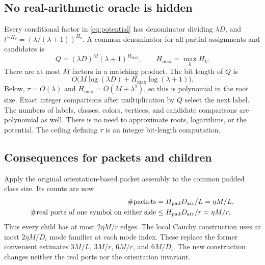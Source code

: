 \documentclass[11pt]{article}
\theoremstyle{remark}\newtheorem{remark}[theorem]{Remark}
\newcommand{\Darr}{D_{\rm arr}}
\newcommand{\Hpad}{H_{\rm pad}}
\begin{document}
\subsection{No real-arithmetic oracle is hidden}
Every conditional factor in \eqref{eq:potential} has denominator dividing \(\lambda D\), and \(t^{-H_k}=(\lambda/(\lambda+1))^{H_k}\). A common denominator for all partial assignments and candidates is
\begin{equation}
 Q=(\lambda D)^M(\lambda+1)^{H_{\max}},\qquad
 H_{\max}=\max_k H_k.\label{eq:denominator}
\end{equation}
There are at most \(M\) factors in a matching product. The bit length of \(Q\) is
\[
 O\bigl(M\log(\lambda D)+H_{\max}\log(\lambda+1)\bigr).
\]
Below, \(\tau=O(\lambda)\) and \(H_{\max}=O(M+\lambda^2)\), so this is polynomial in the root size. Exact integer comparisons after multiplication by \(Q\) select the next label. The numbers of labels, classes, colors, vertices, and candidate comparisons are polynomial as well. There is no need to approximate roots, logarithms, or the potential. The ceiling defining \(\tau\) is an integer bit-length computation.

\subsection{Consequences for packets and children}
Apply the original orientation-based packet assembly to the common padded class size. Its counts are now
\begin{align}
 \#\text{packets}&=\Hpad\Darr/L=\eta M/L,\label{eq:packetcount}\\
 \#\text{real ports of one symbol on either side}
 &\le\Hpad\Darr/r=\eta M/r.\label{eq:portcount}
\end{align}
Thus every child has at most \(2\eta M/r\) edges. The local Cauchy construction uses at most \(2\eta M/D_i\) mode families at each mode index. These replace the former convenient estimates \(3M/L\), \(3M/r\), \(6M/r\), and \(6M/D_i\). The new construction changes neither the real ports nor the orientation invariant.
\end{document}
